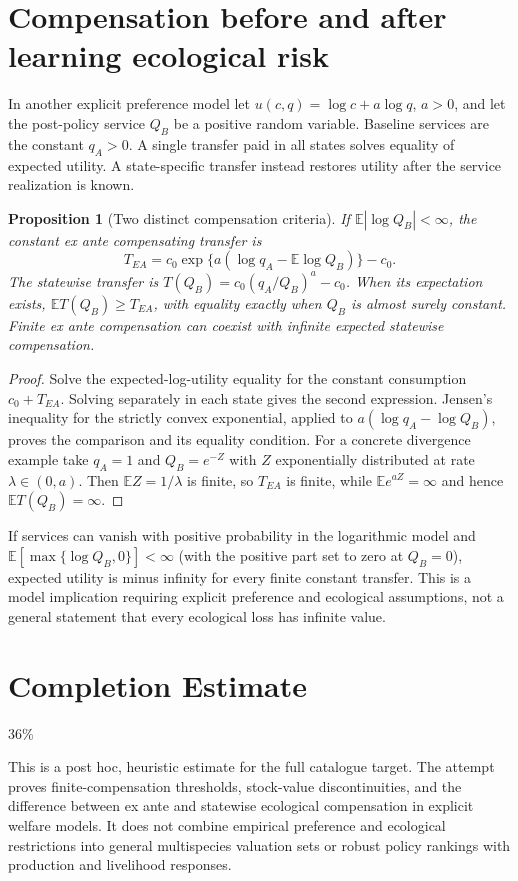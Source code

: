 \documentclass[11pt,a4paper]{article}
\newtheorem{proposition}[theorem]{Proposition}
\theoremstyle{definition}
\theoremstyle{remark}
\newcommand{\E}{\mathbb{E}}
\begin{document}
\section{Compensation before and after learning ecological risk}
In another explicit preference model let $u(c,q)=\log c+a\log q$, $a>0$, and let the post-policy service $Q_B$ be a positive random variable. Baseline services are the constant $q_A>0$. A single transfer paid in all states solves equality of expected utility. A state-specific transfer instead restores utility after the service realization is known.

\begin{proposition}[Two distinct compensation criteria]
If $\E|\log Q_B|<\infty$, the constant ex ante compensating transfer is
\[
 T_{EA}=c_0\exp\{a(\log q_A-\E\log Q_B)\}-c_0.
\]
The statewise transfer is $T(Q_B)=c_0(q_A/Q_B)^a-c_0$. When its expectation exists,
$\E T(Q_B)\geq T_{EA}$, with equality exactly when $Q_B$ is almost surely constant. Finite ex ante compensation can coexist with infinite expected statewise compensation.
\end{proposition}
\begin{proof}
Solve the expected-log-utility equality for the constant consumption $c_0+T_{EA}$. Solving separately in each state gives the second expression. Jensen's inequality for the strictly convex exponential, applied to $a(\log q_A-\log Q_B)$, proves the comparison and its equality condition. For a concrete divergence example take $q_A=1$ and $Q_B=e^{-Z}$ with $Z$ exponentially distributed at rate $\lambda\in(0,a)$. Then $\E Z=1/\lambda$ is finite, so $T_{EA}$ is finite, while $\E e^{aZ}=\infty$ and hence $\E T(Q_B)=\infty$.
\end{proof}

If services can vanish with positive probability in the logarithmic model and $\E[\max\{\log Q_B,0\}]<\infty$ (with the positive part set to zero at $Q_B=0$), expected utility is minus infinity for every finite constant transfer. This is a model implication requiring explicit preference and ecological assumptions, not a general statement that every ecological loss has infinite value.

\section{Completion Estimate}
36\%

This is a post hoc, heuristic estimate for the full catalogue target.
The attempt proves finite-compensation thresholds, stock-value discontinuities, and the difference between ex ante and statewise ecological compensation in explicit welfare models. It does not combine empirical preference and ecological restrictions into general multispecies valuation sets or robust policy rankings with production and livelihood responses.
\end{document}
